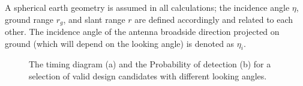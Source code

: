 \documentclass[conference,a4paper]{IEEEtran}
\begin{document}
    A spherical earth geometry is assumed in all calculations;
    the incidence angle $\eta$, ground range $r_g$, and slant range $r$ are defined accordingly and related to each other.
    The incidence angle of the antenna broadside direction projected on ground (which will depend on the looking angle) is denoted as $\eta_i$.
    \begin{figure*}[t]
        \centering
        \hfil
        \caption{The timing diagram (a) and the Probability of detection (b) for a selection of valid design candidates with different looking angles.}
        \label{fig:double column}
    \end{figure*}
\end{document}

